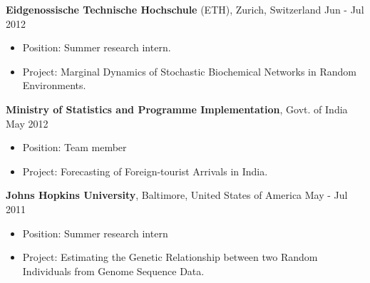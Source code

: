 \documentclass[10pt]{article}
\newenvironment{innerlist}[1][\enskip\textbullet]%
        {\begin{itemize}[#1,leftmargin=*,parsep=0pt,itemsep=0pt,topsep=0pt,partopsep=0pt]}
        {\end{itemize}}
\newcommand{\halfblankline}{\quad\vspace{-0.5\baselineskip}\pagebreak[3]}
\begin{document}
\halfblankline

{\bf Eidgenossische Technische Hochschule} (ETH), Zurich, Switzerland  \hfill Jun - Jul 2012
\vspace{0.03in}
\begin{innerlist}
\item {Position}: Summer research intern.
\item {Project}: Marginal Dynamics of Stochastic Biochemical Networks in Random Environments.
\end{innerlist}

\halfblankline

{\bf Ministry of Statistics and Programme Implementation}, Govt. of India  \hfill May 2012
\vspace{0.03in}
\begin{innerlist}
\item {Position}: Team member
\item {Project}: Forecasting of Foreign-tourist Arrivals in India.
\end{innerlist}

\halfblankline

{\bf Johns Hopkins University}, Baltimore, United States of America    \hfill May - Jul 2011
\vspace{0.03in}
\begin{innerlist}
\item {Position}: Summer research intern
\item {Project}: Estimating the Genetic Relationship between two Random Individuals from Genome Sequence Data.
\end{innerlist}
\end{document}
